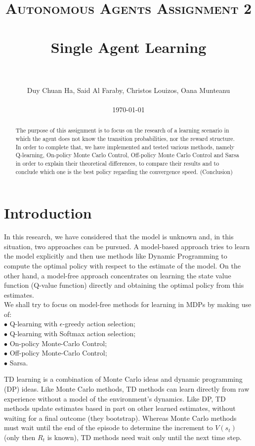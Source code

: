\documentclass[paper=a4, fontsize=11pt]{scrartcl}
\title{
		\usefont{OT1}{bch}{b}{n}
		\normalfont \normalsize \textsc{Autonomous Agents Assignment 2} \\ [25pt]
		\horrule{0.5pt} \\[0.4cm]
		\huge Single Agent Learning \\
		\horrule{2pt} \\[0.5cm]
}
\author{
        Duy Chuan Ha, Said Al Faraby, Christos Louizos, Oana Munteanu %
        \\
        \\
        \today
}
\date{}
\numberwithin{equation}{section}		%
\numberwithin{figure}{section}			%
\numberwithin{table}{section}				%
\begin{document}
\maketitle
\bigskip
\begin{abstract}
The purpose of this assignment is to focus on the research of a learning scenario in which the agent does not know the transition probabilities, nor the reward structure.  In order to complete that, we have implemented and tested various methods, namely  Q-learning, On-policy Monte Carlo Control, Off-policy Monte Carlo Control and Sarsa in order to explain their theoretical differences, to compare their results and to conclude which one is the best policy regarding the convergence speed. (Conclusion)\\
\end{abstract}

\section{Introduction}
In this research, we have considered that the model is unknown and, in this situation, two approaches can be pursued. A model-based approach tries to learn the model explicitly and then use methods like Dynamic Programming to compute the optimal policy with respect to the estimate of the model. On the other hand, a model-free approach concentrates on learning the state value function (Q-value function) directly and obtaining the optimal policy from this estimates.\\
We shall try to focus on model-free methods for learning in MDPs by making use of: \\
$\bullet$ Q-learning with $\epsilon$-greedy action selection; \\
$\bullet$ Q-learning with Softmax action selection; \\
$\bullet$ On-policy Monte-Carlo Control; \\
$\bullet$ Off-policy Monte-Carlo Control; \\
$\bullet$ Sarsa.


TD learning is a combination of Monte Carlo ideas and dynamic programming (DP) ideas. Like Monte Carlo methods, TD methods can learn directly from raw experience without a model of the environment's dynamics. Like DP, TD methods update estimates based in part on other learned estimates, without waiting for a final outcome (they bootstrap).
Whereas Monte Carlo methods must wait until the end of the episode to determine the increment to $V(s_t)$ (only then $R_t$ is  known), TD methods need wait only until the next time step.
\end{document}
